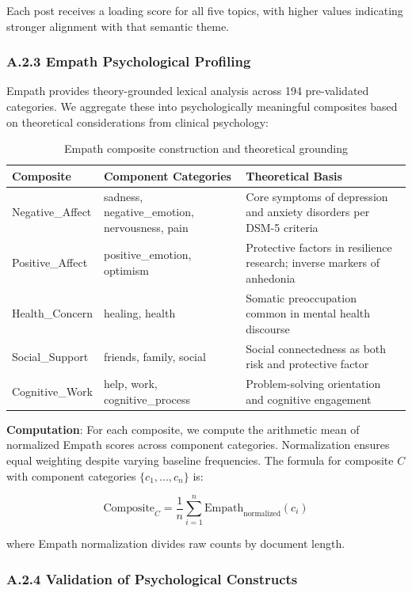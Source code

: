 \documentclass[letterpaper]{article} %
\begin{document}
Each post receives a loading score for all five topics, with higher values indicating stronger alignment with that semantic theme.

\subsubsection{A.2.3 Empath Psychological Profiling}

Empath provides theory-grounded lexical analysis across 194 pre-validated categories. We aggregate these into psychologically meaningful composites based on theoretical considerations from clinical psychology:

\begin{table}[h]
\centering
\caption{Empath composite construction and theoretical grounding}
\begin{tabular}{p{2.5cm}p{6cm}p{8.5cm}}
\toprule
\textbf{Composite} & \textbf{Component Categories} & \textbf{Theoretical Basis} \\
\midrule
Negative\_Affect & 
sadness, negative\_emotion, nervousness, pain & 
Core symptoms of depression and anxiety disorders per DSM-5 criteria \\
\midrule
Positive\_Affect & 
positive\_emotion, optimism & 
Protective factors in resilience research; inverse markers of anhedonia \\
\midrule
Health\_Concern & 
healing, health & 
Somatic preoccupation common in mental health discourse \\
\midrule
Social\_Support & 
friends, family, social & 
Social connectedness as both risk and protective factor \\
\midrule
Cognitive\_Work & 
help, work, cognitive\_process & 
Problem-solving orientation and cognitive engagement \\
\bottomrule
\end{tabular}
\end{table}

\textbf{Computation}: For each composite, we compute the arithmetic mean of normalized Empath scores across component categories. Normalization ensures equal weighting despite varying baseline frequencies. The formula for composite $C$ with component categories $\{c_1, ..., c_n\}$ is:

$$\text{Composite}_C = \frac{1}{n} \sum_{i=1}^{n} \text{Empath}_{\text{normalized}}(c_i)$$

where Empath normalization divides raw counts by document length.

\subsubsection{A.2.4 Validation of Psychological Constructs}
\end{document}
